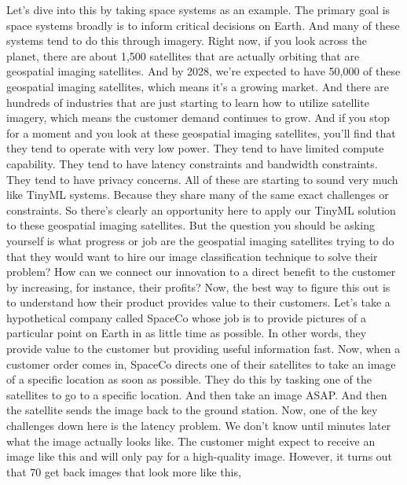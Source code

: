 {{{{{{{{    Let's dive into this by taking space systems as an example.
    The primary goal is space systems broadly is
    to inform critical decisions on Earth.
    And many of these systems tend to do this through imagery.
    Right now, if you look across the planet,
    there are about 1,500 satellites that are actually orbiting
    that are geospatial imaging satellites.
    And by 2028, we're expected to have 50,000 of these geospatial imaging
    satellites, which means it's a growing market.
    And there are hundreds of industries that
    are just starting to learn how to utilize satellite imagery, which means
    the customer demand continues to grow.
    And if you stop for a moment and you look at these geospatial imaging
    satellites, you'll find that they tend to operate with very low power.
    They tend to have limited compute capability.
    They tend to have latency constraints and bandwidth constraints.
    They tend to have privacy concerns.
    All of these are starting to sound very much like TinyML systems.
    Because they share many of the same exact challenges or constraints.
    So there's clearly an opportunity here to apply our TinyML solution
    to these geospatial imaging satellites.
    But the question you should be asking yourself
    is what progress or job are the geospatial imaging satellites trying
    to do that they would want to hire our image classification
    technique to solve their problem?
    How can we connect our innovation to a direct benefit to the customer
    by increasing, for instance, their profits?
    Now, the best way to figure this out is to understand how their product
    provides value to their customers.
    Let's take a hypothetical company called SpaceCo
    whose job is to provide pictures of a particular point on Earth
    in as little time as possible.
    In other words, they provide value to the customer
    but providing useful information fast.
    Now, when a customer order comes in, SpaceCo
    directs one of their satellites to take an image of a specific location
    as soon as possible.
    They do this by tasking one of the satellites
    to go to a specific location.
    And then take an image ASAP.
    And then the satellite sends the image back to the ground station.
    Now, one of the key challenges down here is the latency problem.
    We don't know until minutes later what the image actually looks like.
    The customer might expect to receive an image like this
    and will only pay for a high-quality image.
    However, it turns out that 70%
    get back images that look more like this,
}}}}}}}}
